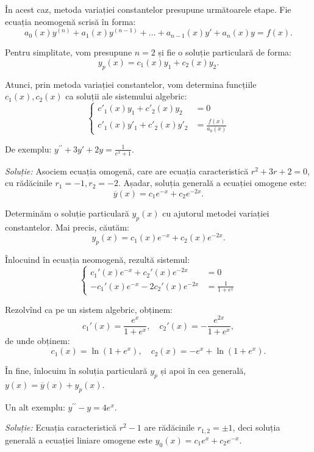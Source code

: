 \documentclass[11pt,a4paper]{article}
\theoremstyle{dotless}
\theoremstyle{dotlessdr}
\begin{document}
În acest caz, metoda variației constantelor presupune următoarele etape.
Fie ecuația neomogenă scrisă în forma:
\[
  a_0(x) y^{(n)} + a_1(x) y^{(n - 1)} + \dots + a_{n-1}(x) y' + a_n(x) y = f(x).
\]

Pentru simplitate, vom presupune $n = 2$ și fie o soluție particulară de forma:
\[
  y_p(x) = c_1(x) y_1 + c_2(x) y_2.
\]

Atunci, prin metoda variației constantelor, vom determina funcțiile $c_1(x), c_2(x)$
ca soluții ale sistemului algebric:
\[
  \begin{cases}
    c'_1(x) y_1 + c'_2(x) y_2 &= 0 \\
    c'_1(x) y'_1 + c'_2(x) y'_2 &= \frac{f(x)}{a_0(x)}
  \end{cases}
\]

\vspace{1cm}

De exemplu: $y^{\prime \prime} + 3y' + 2y = \frac{1}{e^x + 1}$.

\emph{Soluție:} Asociem ecuația omogenă, care are ecuația caracteristică
$r^2 + 3r + 2 = 0$, cu rădăcinile $r_1 = -1, r_2 = -2$. Așadar, soluția generală
a ecuației omogene este:
\[
  \overline{y}(x) = c_1 e^{-x} + c_2 e^{-2x}.
\]

Determinăm o soluție particulară $y_p(x)$ cu ajutorul metodei variației constantelor.
Mai precis, căutăm:
\[
  y_p(x) = c_1(x) e^{-x} + c_2(x) e^{-2x}.
\]

Înlocuind în ecuația neomogenă, rezultă sistemul:
\[
  \begin{cases}
    c_1'(x) e^{-x} + c_2'(x) e^{-2x} &= 0 \\
    -c_1'(x) e^{-x} - 2c_2'(x) e^{-2x} &= \frac{1}{1 + e^x}
  \end{cases}
\]

Rezolvînd ca pe un sistem algebric, obținem:
\[
  c_1'(x) = \frac{e^x}{1 + e^x}, \quad c_2'(x) = -\frac{e^{2x}}{1 + e^x},
\]
de unde obținem:
\[
  c_1(x) = \ln(1 + e^x), \quad c_2(x) = -e^x + \ln(1 + e^x).
\]

În fine, înlocuim în soluția particulară $y_p$ și apoi în cea generală,
$y(x) = \overline{y}(x) + y_p(x)$.

\vspace{1cm}

Un alt exemplu: $y^{\prime\prime} - y = 4e^x$.

\emph{Soluție:} Ecuația caracteristică $r^2 - 1$ are rădăcinile $r_{1,2} = \pm 1$,
deci soluția generală a ecuației liniare omogene este $y_0(x) = c_1 e^x + c_2e^{-x}$.
\end{document}
